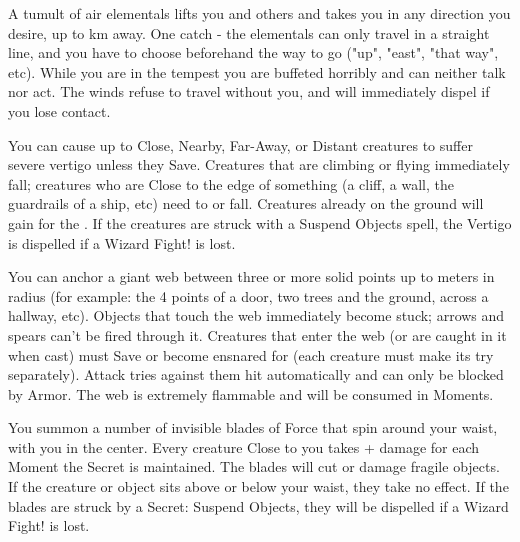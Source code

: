 A tumult of air elementals lifts you and  others and takes you in any direction you desire, up to \SUMDICE km away.   One catch - the elementals can only travel in a straight line, and you have to choose beforehand the way to go ("up", "east", "that way", etc).  While you are in the tempest you are buffeted horribly and can neither talk nor act.  The winds refuse to travel without you, and will immediately dispel if you lose contact.


\WIZARDRY[
  Name=Vertigo,
  Link=secrets-vertigo,
  Alignment=Mind,
  Save=Y (negate),
  Duration=\DICE,
  Counter=\mylink{Suspend Objects}{secrets-suspend-objects} ,
  Keywords=None,
  Target= Any Distance
]

You can cause up to \DICE Close, Nearby, Far-Away, or Distant creatures to suffer severe vertigo unless they Save.  Creatures that are climbing or
flying immediately fall; creatures who are Close to the edge of something (a cliff, a wall, the guardrails of a ship, etc) need to \RSTRY{\FOC} or fall.
Creatures already on the ground will gain  for the \Duration. If the creatures are struck with a Suspend Objects spell, the Vertigo is dispelled if a Wizard Fight! is lost.

\newpage

\WIZARDRY[
  Name=Web,
  Link=secrets-web,
  Alignment=Entropy,
  Save=Y (negate),
  Duration=\DICE,
  Counter=None ,
  Keywords=None,
  Target=Nearby or Far Away Area
]

You can anchor a giant web between three or more solid points up to \DICE meters in radius (for example: the 4 points of a door, two trees and the ground, across a hallway, etc).  Objects that touch the web immediately become stuck; arrows and spears can't be fired through it.  Creatures that enter the web (or are caught in it when cast) must Save or become ensnared for \Duration (each creature must make its \Duration try separately). Attack tries against them hit automatically and can only be blocked by Armor.  The web is extremely flammable and will be consumed in \DICE Moments.


\WIZARDRY[
  Name=Whirling Blades,
  Link=secrets-whirling-blades,
  Alignment=Entropy,
  Save=N,
  Duration=Concentration,
  Counter=\mylink{Suspend Objects}{secrets-suspend-objects} ,
  Keywords=None,
  Target=Self
]

You summon a number of invisible blades of Force that spin around your waist, with you in the center.  Every creature Close to you takes \DICE+\DICE
damage for each Moment the Secret is maintained.  The blades will cut or damage fragile objects.  If the creature or object sits above or below your waist, they take no effect.  If the blades are struck by a Secret: Suspend Objects, they will be dispelled if a Wizard Fight! is lost.
